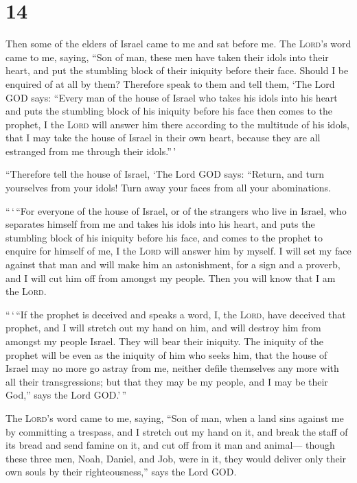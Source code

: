 \hypertarget{section-13}{%
\section{14}\label{section-13}}

 Then some of the elders of Israel came to me and sat
before me.  The \textsc{Lord}'s word came to me, saying,
 ``Son of man, these men have taken their idols into their
heart, and put the stumbling block of their iniquity before their face.
Should I be enquired of at all by them?  Therefore speak
to them and tell them, `The Lord GOD says: ``Every man of the house of
Israel who takes his idols into his heart and puts the stumbling block
of his iniquity before his face then comes to the prophet, I the
\textsc{Lord} will answer him there according to the multitude of his
idols,  that I may take the house of Israel in their own
heart, because they are all estranged from me through their idols.''\,'

 ``Therefore tell the house of Israel, `The Lord GOD says:
``Return, and turn yourselves from your idols! Turn away your faces from
all your abominations.

 ``\,`\,``For everyone of the house of Israel, or of the
strangers who live in Israel, who separates himself from me and takes
his idols into his heart, and puts the stumbling block of his iniquity
before his face, and comes to the prophet to enquire for himself of me,
I the \textsc{Lord} will answer him by myself.  I will set
my face against that man and will make him an astonishment, for a sign
and a proverb, and I will cut him off from amongst my people. Then you
will know that I am the \textsc{Lord}.

 ``\,`\,``If the prophet is deceived and speaks a word, I,
the \textsc{Lord}, have deceived that prophet, and I will stretch out my
hand on him, and will destroy him from amongst my people Israel.
 They will bear their iniquity. The iniquity of the
prophet will be even as the iniquity of him who seeks him,
 that the house of Israel may no more go astray from me,
neither defile themselves any more with all their transgressions; but
that they may be my people, and I may be their God,'' says the Lord
GOD.'\,''

 The \textsc{Lord}'s word came to me, saying,
 ``Son of man, when a land sins against me by committing
a trespass, and I stretch out my hand on it, and break the staff of its
bread and send famine on it, and cut off from it man and animal---
 though these three men, Noah, Daniel, and Job, were in
it, they would deliver only their own souls by their righteousness,''
says the Lord GOD.

